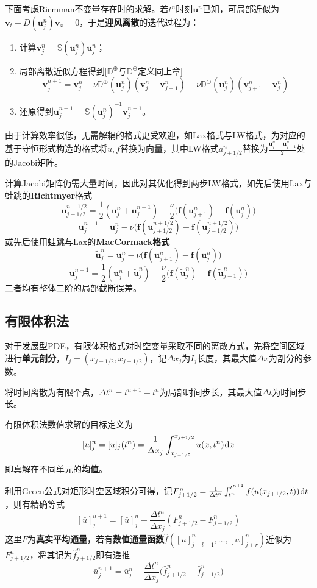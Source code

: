 \documentclass[a4paper,UTF8,fontset=windows]{ctexart}
\newcommand*{\dr}{\hspace{0.07em}\mathrm{d}}
\newcommand*{\bu}{\mathbf{u}}
\begin{document}
下面考虑Riemman不变量存在时的求解。若$t^n$时刻$\bu^n$已知，可局部近似为$\mathbf{v}_t+D(\bu_j^n)\mathbf{v}_x=0$，于是\textbf{迎风离散}的迭代过程为：
\begin{enumerate}
    \item 计算$\mathbf{v}_j^n=\mathbb{S}(\bu_j^n)\bu_j^n$；
    \item 局部离散近似方程得到[$\mathbb{D}^\oplus$与$\mathbb{D}^\ominus$定义同上章]
    $$\mathbf{v}_j^{n+1}=\mathbf{v}_j^n-\nu\mathbb{D}^\oplus(\bu_j^n)(\mathbf{v}_j^n-\mathbf{v}_{j-1}^n)-\nu\mathbb{D}^\ominus(\bu_j^n)(\mathbf{v}_{j+1}^n-\mathbf{v}_j^n)$$
    \item 还原得到$\bu_j^{n+1}=\mathbb{S}(\bu_j^n)^{-1}\mathbf{v}_j^{n+1}$。
\end{enumerate}

由于计算效率很低，无需解耦的格式更受欢迎，如Lax格式与LW格式，为对应的基于守恒形式构造的格式将$u,f$替换为向量，其中LW格式$a_{j+1/2}^n$替换为$\frac{\bu_j^n+\bu_{j+1}^n}{2}$处的Jacobi矩阵。

计算Jacobi矩阵仍需大量时间，因此对其优化得到两步LW格式，如先后使用Lax与蛙跳的\textbf{Richtmyer}格式
$$\bu_{j+1/2}^{n+1/2}=\frac{1}{2}(\bu_j^n+\bu_j^{n+1})-\frac{\nu}{2}\big(\mathbf{f}(\bu_{j+1}^n)-\mathbf{f}(\bu_j^n)\big)$$
$$\bu_j^{n+1}=\bu_j^n-\nu\big(\mathbf{f}(\bu_{j+1/2}^{n+1/2})-\mathbf{f}(\bu_{j-1/2}^{n+1/2})\big)$$
或先后使用蛙跳与Lax的\textbf{MacCormack格式}
$$\tilde{\bu}_j^n=\bu_j^n-\nu\big(\mathbf{f}(\bu_{j+1}^n)-\mathbf{f}(\bu_j^n)\big)$$
$$\bu_j^{n+1}=\frac{1}{2}(\bu_j^n+\tilde{\bu}_j^n)-\frac{\nu}{2}\big(\mathbf{f}(\tilde{\bu}_j^n)-\mathbf{f}(\tilde{\bu}_{j-1}^n)\big)$$
二者均有整体二阶的局部截断误差。

\subsection{有限体积法}
对于发展型PDE，有限体积格式对时空变量采取不同的离散方式，先将空间区域进行\textbf{单元剖分}，$I_j=(x_{j-1/2},x_{j+1/2})$，记$\Delta x_j$为$I_j$长度，其最大值$\Delta x$为剖分的参数。

将时间离散为有限个点，$\Delta t^n=t^{n+1}-t^n$为局部时间步长，其最大值$\Delta t$为时间步长。

有限体积法数值求解的目标定义为
$$[\bar{u}]_j^n=[\bar{u}]_j(t^n)=\frac{1}{\Delta x_j}\int_{x_{j-1/2}}^{x_{j+1/2}}u(x,t^n)\dr x$$
即真解在不同单元的\textbf{均值}。

利用Green公式对矩形时空区域积分可得，记$F_{j+1/2}^n=\frac{1}{\Delta t^n}\int_{t^n}^{t^{n+1}}f(u(x_{j+1/2},t))\dr t$，则有精确等式
$$[\bar{u}]_j^{n+1}=[\bar{u}]_j^n-\frac{\Delta t^n}{\Delta x_j}(F_{j+1/2}^n-F_{j-1/2}^n)$$
这里$F$为\textbf{真实平均通量}，若有\textbf{数值通量函数}$\hat{f}([\bar{u}]_{j-l-1}^n,\dots,[\bar{u}]_{j+r}^n)$近似为$F_{j+1/2}^n$，将其记为$\hat{f}_{j+1/2}^n$即有递推
$$\bar{u}_j^{n+1}=\bar{u}_j^n-\frac{\Delta t^n}{\Delta x_j}\big(\hat{f}_{j+1/2}^n-\hat{f}_{j-1/2}^n\big)$$
\end{document}
